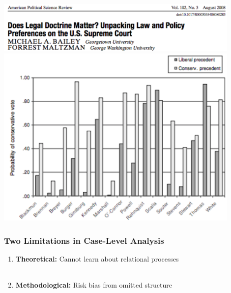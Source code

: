 \documentclass[handout]{beamer}
\begin{document}
\begin{frame}[plain]%
\centering

\includegraphics[width = 0.9\textwidth ]{../../images/apsrReference}
\\
\includegraphics[width = 0.9\textwidth ]{../../images/apsrTableScreenshot}
\end{frame}

\begin{frame} \frametitle{Two Limitations in Case-Level Analysis}
\Large
\begin{enumerate}
\item {\bf Theoretical:} Cannot learn about relational processes
\\~\\
\item {\bf Methodological:} Risk bias from omitted structure
\end{enumerate}

\end{frame}
\end{document}
